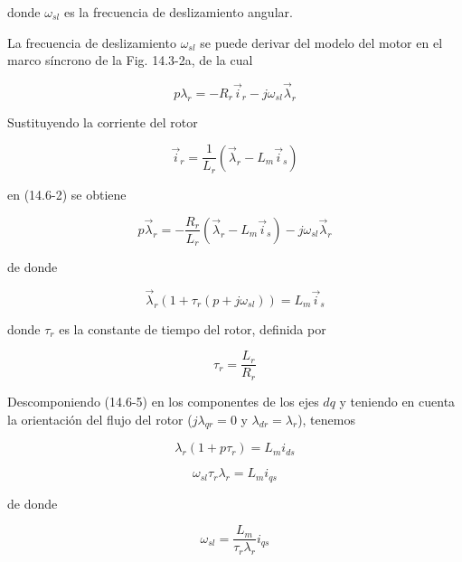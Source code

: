 \documentclass[letterpaper,12pt]{article}
\begin{document}
donde $\omega_{sl}$ es la frecuencia de deslizamiento angular.

La frecuencia de deslizamiento $\omega_{sl}$ se puede derivar del modelo del motor en el marco síncrono de la Fig. 14.3-2a, de la cual

\begin{equation}
p \lambda_r = -R_r \vec{i}_r - j \omega_{sl} \vec{\lambda}_r \tag{14.6-2}
\end{equation}

Sustituyendo la corriente del rotor

\begin{equation}
\vec{i}_r = \frac{1}{L_r} (\vec{\lambda}_r - L_m \vec{i}_s) \tag{14.6-3}
\end{equation}

en (14.6-2) se obtiene

\begin{equation}
p \vec{\lambda}_r = -\frac{R_r}{L_r} \left( \vec{\lambda}_r - L_m \vec{i}_s \right) - j \omega_{sl} \vec{\lambda}_r \tag{14.6-4}
\end{equation}

de donde

\begin{equation}
\vec{\lambda}_r (1 + \tau_r (p + j \omega_{sl})) = L_m \vec{i}_s \tag{14.6-5}
\end{equation}

donde $\tau_r$ es la constante de tiempo del rotor, definida por

\begin{equation}
\tau_r = \frac{L_r}{R_r} \tag{14.6-6}
\end{equation}

\clearpage
Descomponiendo (14.6-5) en los componentes de los ejes $dq$ y teniendo en cuenta la orientación del flujo del rotor ($j \lambda_{qr} = 0$ y $\lambda_{dr} = \lambda_r$), tenemos

\begin{equation}
\lambda_r (1 + p \tau_r) = L_m i_{ds} \tag{14.6-7}
\end{equation}

\begin{equation}
\omega_{sl} \tau_r \lambda_r = L_m i_{qs} \tag{14.6-7}
\end{equation}

de donde

\begin{equation}
\omega_{sl} = \frac{L_m}{\tau_r \lambda_r} i_{qs} \tag{14.6-8}
\end{equation}
\end{document}
